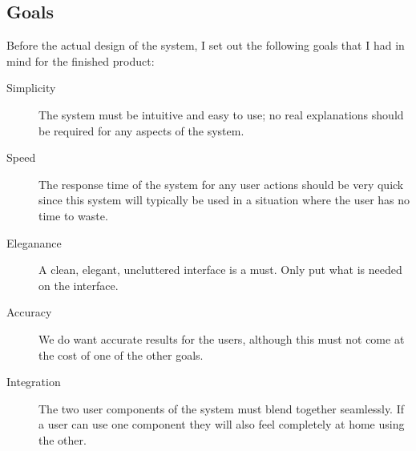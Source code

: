 \subsection{Goals}
Before the actual design of the system, I set out the following goals that I had in mind for the finished product:
\begin{description}
\item [Simplicity] The system must be intuitive and easy to use; no real explanations should be required for any aspects of the system. 
\item [Speed] The response time of the system for any user actions should be very quick since this system will typically be used in a situation where the user has no time to waste. 
\item [Eleganance] A clean, elegant, uncluttered interface is a must. Only put what is needed on the interface.  
\item [Accuracy] We do want accurate results for the users, although this must not come at the cost of one of the other goals.
\item [Integration] The two user components of the system must blend together seamlessly. If a user can use one component they will also feel completely at home using the other. 
\end{description}
